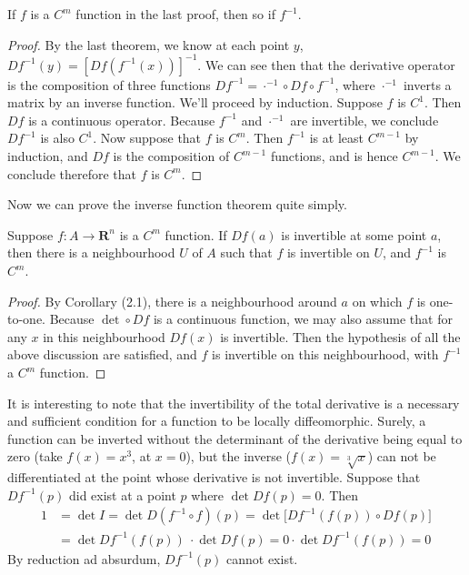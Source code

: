 \begin{remark}
    If $f$ is a $C^m$ function in the last proof, then so if $f^{-1}$.
\end{remark}
\begin{proof}
    By the last theorem, we know at each point $y$, $Df^{-1}(y) = [Df(f^{-1}(x))]^{-1}$. We can see then that the derivative operator is the composition of three functions $Df^{-1} = \cdot^{-1} \circ Df \circ f^{-1}$, where $\cdot^{-1}$ inverts a matrix by an inverse function. We'll proceed by induction. Suppose $f$ is $C^1$. Then $Df$ is a continuous operator. Because $f^{-1}$ and $\cdot^{-1}$ are invertible, we conclude $Df^{-1}$ is also $C^1$. Now suppose that $f$ is $C^m$. Then $f^{-1}$ is at least $C^{m-1}$ by induction, and $Df$ is the composition of $C^{m-1}$ functions, and is hence $C^{m-1}$. We conclude therefore that $f$ is $C^m$.
\end{proof}

Now we can prove the inverse function theorem quite simply.

\begin{theorem}
    Suppose $f:A \to \mathbf{R}^{n}$ is a $C^m$ function. If $Df(a)$ is invertible at some point $a$, then there is a neighbourhood $U$ of $A$ such that $f$ is invertible on $U$, and $f^{-1}$ is $C^m$.
\end{theorem}
\begin{proof}
    By Corollary (2.1), there is a neighbourhood around $a$ on which $f$ is one-to-one. Because $\det \circ Df$ is a continuous function, we may also assume that for any $x$ in this neighbourhood $Df(x)$ is invertible. Then the hypothesis of all the above discussion are satisfied, and $f$ is invertible on this neighbourhood, with $f^{-1}$ a $C^m$ function.
\end{proof}

It is interesting to note that the invertibility of the total derivative is a necessary and sufficient condition for a function to be locally diffeomorphic. Surely, a function can be inverted without the determinant of the derivative being equal to zero (take $f(x) = x^3$, at $x = 0$), but the inverse ($f(x) = \sqrt[3]{x}$) can not be differentiated at the point whose derivative is not invertible. Suppose that $Df^{-1}(p)$ did exist at a point $p$ where $\det Df(p) = 0$. Then
%
\begin{align*}
    1 &= \det I = \det D(f^{-1} \circ f)(p) = \det \big[ Df^{-1}(f(p)) \circ Df(p) \big]\\
    &= \det Df^{-1}(f(p))\ \cdot \det Df(p) = 0 \cdotp \det Df^{-1}(f(p)) = 0
\end{align*}
%
By reduction ad absurdum, $Df^{-1}(p)$ cannot exist.

